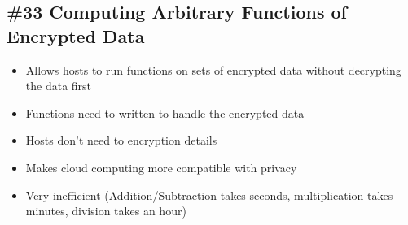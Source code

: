 \subsection{\#33 Computing Arbitrary Functions of Encrypted Data}
\begin{itemize}
	\item Allows hosts to run functions on sets of encrypted data without decrypting the data first
	\item Functions need to written to handle the encrypted data
	\item Hosts don't need to encryption details
	\item Makes cloud computing more compatible with privacy
	\item Very inefficient (Addition/Subtraction takes seconds, multiplication takes minutes, division takes an hour)
\end{itemize}